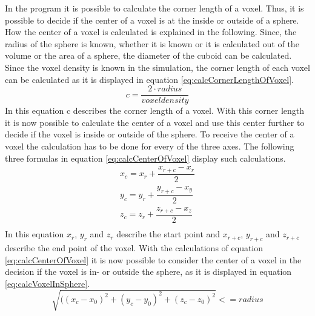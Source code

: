 In the program it is possible to calculate the corner length of a voxel. Thus, it is possible to decide if the center of a voxel is at the inside or outside of a sphere. How the center of a voxel is calculated is explained in the following. \newline
Since, the radius of the sphere is known, whether it is known or it is calculated out of the volume or the area of a sphere, the diameter of the cuboid can be calculated. Since the voxel density is known in the simulation, the corner length of each voxel can be calculated as it is displayed in equation \ref{eq:calcCornerLengthOfVoxel}.
\begin{equation}\label{eq:calcCornerLengthOfVoxel}
c = \dfrac{2 \cdot radius}{voxel density}
\end{equation}
In this equation c describes the corner length of a voxel. With this corner length it is now possible to calculate the center of a voxel and use this center further to decide if the voxel is inside or outside of the sphere. To receive the center of a voxel the calculation has to be done for every of the three axes. The following three formulas in equation \ref{eq:calcCenterOfVoxel} display such calculations. 
\begin{equation}\label{eq:calcCenterOfVoxel}
\begin{split}
x_{c} = x_{r} + \dfrac{x_{r+c} - x_{r}}{2} \\
y_{c} = y_{r} + \dfrac{y_{r+c} - x_{y}}{2} \\
z_{c} = z_{r} + \dfrac{z_{r+c} - x_{z}}{2} \\
\end{split}
\end{equation}
In this equation $x_{r}$, $y_{r}$ and $z_{r}$ describe the start point and $x_{r+c}$, $y_{r+c}$ and $z_{r+c}$ describe the end point of the voxel.
With the calculations of equation \ref{eq:calcCenterOfVoxel} it is now possible to consider the center of a voxel in the decision if the voxel is in- or outside the sphere, as it is displayed in equation \ref{eq:calcVoxelInSphere}.
\begin{equation}\label{eq:calcVoxelInSphere}
\sqrt{((x_{c} - x_{0})^{2} + (y_{c} - y_{0})^{2} + (z_{c} -z_{0})^{2}} <= radius
\end{equation}



